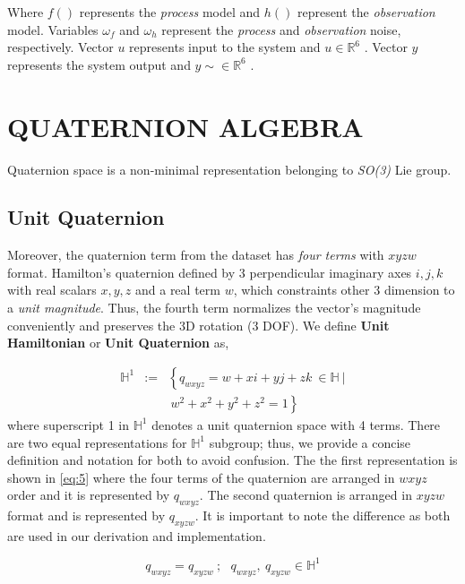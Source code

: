 \documentclass[letterpaper, 10 pt, conference]{ieeeconf}  %
\begin{document}
Where $f()$ represents the \textit{process} model and $h()$ represent the
\textit{observation} model.
Variables $\omega_{f}$ and $\omega_{h}$ represent the \textit{process} and \textit{observation} noise, respectively.
Vector $u$ represents input to the system and $u \in \mathbb{R}^{6}$ .
Vector $y$ represents the system output and $y \sim \in \mathbb{R}^6$ .





\section{QUATERNION ALGEBRA} \label{sec:QuatAlg}

Quaternion space is a non-minimal representation belonging to \textit{SO(3)} Lie group.

\subsection{Unit Quaternion}
Moreover, the quaternion term from the dataset has \textit{four terms} with $xyzw$
format.
Hamilton's quaternion defined by 3 perpendicular imaginary axes $i,j,k$ with
real scalars $x,y,z$ and a real term $w$, which constraints other 3 dimension to
a \textit{unit magnitude}. Thus, the fourth term normalizes the vector's magnitude
conveniently and preserves the 3D rotation (3 DOF). We define \textbf{Unit Hamiltonian}
or \textbf{Unit Quaternion} as,


\begin{eqnarray}\nonumber
\label{eq:9}
\mathbb{H}^{1} &:=&\left\{ q_{wxyz}=w+xi+yj+zk~\in \mathbb{H}~| \right.\\
                   && \left.~w^{2}+x^{2}+y^{2}+z^{2}=1 \right\}
\end{eqnarray}
\noindent
where superscript 1 in $\mathbb{H}^{1}$ denotes a unit quaternion space with 4
terms. There are two equal representations for $\mathbb{H}^{1}$ subgroup; thus,
we provide a concise definition and notation for both to avoid confusion. The
the first representation is shown in \ref{eq:5} where the four terms of the
quaternion are arranged in $wxyz$ order and it is represented by $q_{wxyz}$.
The second quaternion is arranged in $xyzw$ format and is represented by $q_{xyzw}$.
It is important to note the difference as both are used in our derivation and
implementation.

\begin{equation}
\label{eq:12}
q_{wxyz} = q_{xyzw} ~; ~~~ q_{wxyz},~q_{xyzw} \in \mathbb{H}^{1}
\end{equation}
\end{document}

